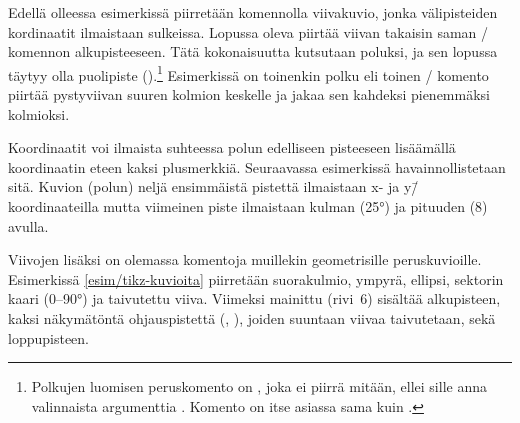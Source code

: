 Edellä olleessa esimerkissä piirretään komennolla 
viivakuvio, jonka välipisteiden kordinaatit ilmaistaan sulkeissa.
Lopussa oleva  piirtää viivan takaisin saman
\-/ komennon alkupisteeseen. Tätä kokonaisuutta kutsutaan
poluksi, ja sen lopussa täytyy olla puolipiste
(\koodi{;}).\footnote{Polkujen luomisen peruskomento on ,
  joka ei piirrä mitään, ellei sille anna valinnaista argumenttia
  . Komento  on itse asiassa sama kuin
  .} Esimerkissä on toinenkin polku eli
toinen \-/ komento piirtää pystyviivan suuren kolmion
keskelle ja jakaa sen kahdeksi pienemmäksi kolmioksi.

Koordinaatit voi ilmaista suhteessa polun edelliseen pisteeseen
lisäämällä koordinaatin eteen kaksi plusmerkkiä. Seuraavassa esimerkissä
havainnollistetaan sitä. Kuvion (polun) neljä ensimmäistä pistettä
ilmaistaan x- ja y\=/ koordinaateilla mutta viimeinen piste ilmaistaan
kulman (25°) ja pituuden (8) avulla.

\begin{koodilohkosis}
\end{koodilohkosis}

\begin{tulossis}
\end{tulossis}

\noindent
Viivojen lisäksi on olemassa komentoja muillekin geometrisille
peruskuvioille. Esimerkissä \ref{esim/tikz-kuvioita} piirretään
suorakulmio, ympyrä, ellipsi, sektorin kaari (0--90°) ja taivutettu
viiva. Viimeksi mainittu (rivi~6) sisältää alkupisteen, kaksi
näkymätöntä ohjauspistettä (, ), joiden
suuntaan viivaa taivutetaan, sekä loppupisteen.

